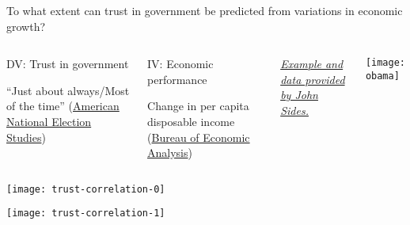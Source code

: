 \documentclass[t]{beamer}
\begin{document}
	
	\begin{frame}[c]{}
		
		\vfill

		To what extent can trust in government be predicted from variations in economic growth?
		
		\vfill
		 
		\begin{columns}[T]

		\begin{block}{DV: Trust in government}

			``Just about always/Most of the time'' (\href{http://www.electionstudies.org/}{American National Election Studies})

		\end{block}

		\begin{block}{IV: Economic performance}

			Change in per capita disposable income (\href{http://www.bea.gov/}{Bureau of Economic Analysis})

		\end{block}

		\vspace{1em}
		\footnotesize{%
			\textit{\href{http://www.themonkeycage.org/2010/02/what_will_make_people_love_gov.html}{Example and data provided by John Sides.}}%
		}


		\texttt{[image: obama]}
		\end{columns}
		
	\end{frame}
	
	

	\begin{frame}[c] %
			
		\begin{center}
			\texttt{[image: trust-correlation-0]}
		\end{center}
				
	\end{frame}

	\begin{frame}[c] %
			
		\begin{center}
			\texttt{[image: trust-correlation-1]}
		\end{center}
				
	\end{frame}
\end{document}
